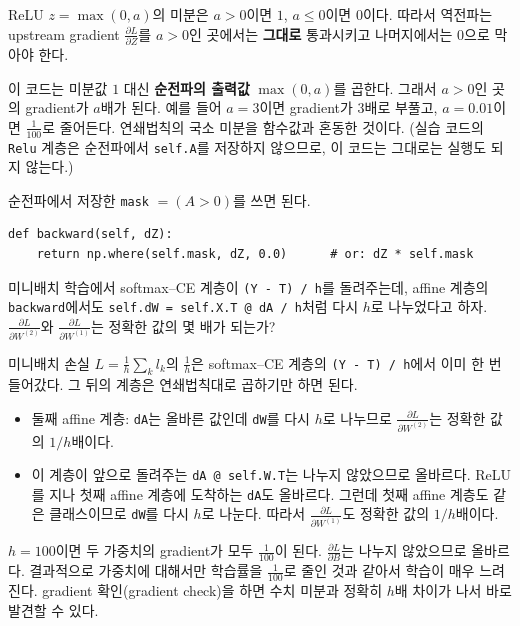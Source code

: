 \documentclass[11pt,a4paper]{article}
\newcommand{\pd}[2]{\frac{\partial #1}{\partial #2}}
\begin{document}
\begin{problems}
\begin{sol}
ReLU $z=\max(0,a)$의 미분은 $a>0$이면 $1$, $a\le0$이면 $0$이다. 따라서 역전파는
upstream gradient $\pd{L}{Z}$를 $a>0$인 곳에서는 \textbf{그대로} 통과시키고 나머지에서는 $0$으로 막아야 한다.

이 코드는 미분값 $1$ 대신 \textbf{순전파의 출력값} $\max(0,a)$를 곱한다.
그래서 $a>0$인 곳의 gradient가 $a$배가 된다. 예를 들어 $a=3$이면 gradient가 $3$배로 부풀고,
$a=0.01$이면 $\frac{1}{100}$로 줄어든다.
연쇄법칙의 국소 미분을 함수값과 혼동한 것이다.
(실습 코드의 \texttt{Relu} 계층은 순전파에서 \texttt{self.A}를 저장하지 않으므로, 이 코드는 그대로는 실행도 되지 않는다.)

순전파에서 저장한 \texttt{mask} $=(A>0)$를 쓰면 된다.
\begin{lstlisting}[numbers=none]
def backward(self, dZ):
    return np.where(self.mask, dZ, 0.0)      # or: dZ * self.mask
\end{lstlisting}
\end{sol}

\item 미니배치 학습에서 softmax--CE 계층이 \texttt{(Y - T) / h}를 돌려주는데,
affine 계층의 \texttt{backward}에서도 \texttt{self.dW = self.X.T @ dA / h}처럼 다시 $h$로 나누었다고 하자.
$\pd{L}{W^{(2)}}$와 $\pd{L}{W^{(1)}}$는 정확한 값의 몇 배가 되는가?

\begin{sol}
미니배치 손실 $L=\frac1h\sum_{k}l_k$의 $\frac1h$은 softmax--CE 계층의 \texttt{(Y - T) / h}에서 이미 한 번 들어갔다.
그 뒤의 계층은 연쇄법칙대로 곱하기만 하면 된다.
\begin{itemize}[leftmargin=1.5em,itemsep=2pt]
\item 둘째 affine 계층: \texttt{dA}는 올바른 값인데 \texttt{dW}를 다시 $h$로 나누므로
$\pd{L}{W^{(2)}}$는 정확한 값의 $\boxed{1/h}$배이다.
\item 이 계층이 앞으로 돌려주는 \texttt{dA @ self.W.T}는 나누지 않았으므로 올바르다.
ReLU를 지나 첫째 affine 계층에 도착하는 \texttt{dA}도 올바르다.
그런데 첫째 affine 계층도 같은 클래스이므로 \texttt{dW}를 다시 $h$로 나눈다.
따라서 $\pd{L}{W^{(1)}}$도 정확한 값의 $\boxed{1/h}$배이다.
\end{itemize}
$h=100$이면 두 가중치의 gradient가 모두 $\frac1{100}$이 된다.
$\pd{L}{B}$는 나누지 않았으므로 올바르다.
결과적으로 가중치에 대해서만 학습률을 $\frac{1}{100}$로 줄인 것과 같아서 학습이 매우 느려진다.
gradient 확인(gradient check)을 하면 수치 미분과 정확히 $h$배 차이가 나서 바로 발견할 수 있다.
\end{sol}


\end{problems}
\end{document}
